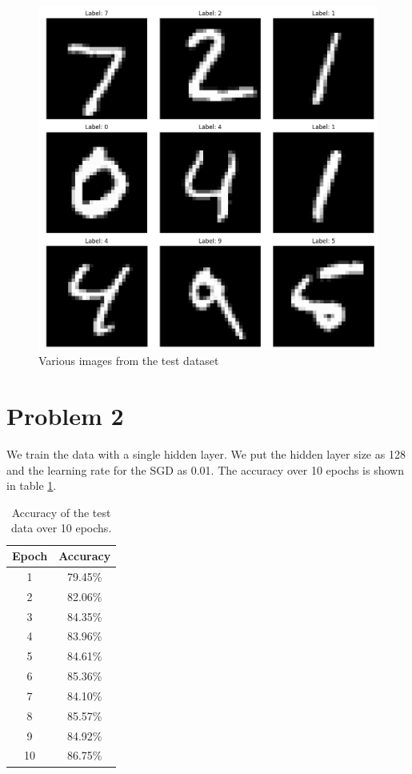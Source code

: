 \documentclass[a4paper]{article}
\begin{document}
\begin{figure}[H]
	\begin{center}
		\includegraphics[scale=0.4]{test.png}
		\caption{Various images from the test dataset}
		\label{test}
	\end{center}
\end{figure}

\section*{Problem 2}
We train the data with a single hidden layer. We put the hidden layer size as 128 and the learning rate for the SGD as 0.01. The accuracy over 10 epochs is shown in table \ref{tab}.
\begin{table}[h!]

	\centering
	
	\begin{tabular}{|c|c|}
		\hline
		Epoch & Accuracy \\
		\hline
		1 & 79.45\% \\
		\hline
		2 & 82.06\% \\
		\hline
		3 &  84.35\%\\
		\hline
		4 &  83.96\%\\
		\hline
		5 &  84.61\%\\
		\hline
		6 &  85.36\%\\
		\hline
		7 &  84.10\%\\
		\hline
		8 &  85.57\%\\
		\hline
		9 &  84.92\%\\
		\hline
		10 &  86.75\%\\
		\hline
	\end{tabular}
	\caption{Accuracy of the test data over 10 epochs. }
	\label{tab}
\end{table}
\end{document}
